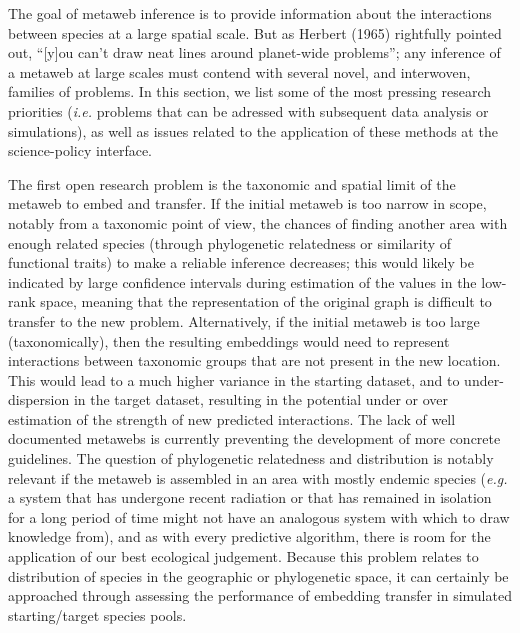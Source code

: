 \documentclass[10pt,oneside]{article}
\begin{document}
The goal of metaweb inference is to provide information about the
interactions between species at a large spatial scale. But as Herbert
(1965) rightfully pointed out, ``{[}y{]}ou can't draw neat lines around
planet-wide problems''; any inference of a metaweb at large scales must
contend with several novel, and interwoven, families of problems. In
this section, we list some of the most pressing research priorities
(\emph{i.e.} problems that can be adressed with subsequent data analysis
or simulations), as well as issues related to the application of these
methods at the science-policy interface.

The first open research problem is the taxonomic and spatial limit of
the metaweb to embed and transfer. If the initial metaweb is too narrow
in scope, notably from a taxonomic point of view, the chances of finding
another area with enough related species (through phylogenetic
relatedness or similarity of functional traits) to make a reliable
inference decreases; this would likely be indicated by large confidence
intervals during estimation of the values in the low-rank space, meaning
that the representation of the original graph is difficult to transfer
to the new problem. Alternatively, if the initial metaweb is too large
(taxonomically), then the resulting embeddings would need to represent
interactions between taxonomic groups that are not present in the new
location. This would lead to a much higher variance in the starting
dataset, and to under-dispersion in the target dataset, resulting in the
potential under or over estimation of the strength of new predicted
interactions. The lack of well documented metawebs is currently
preventing the development of more concrete guidelines. The question of
phylogenetic relatedness and distribution is notably relevant if the
metaweb is assembled in an area with mostly endemic species (\emph{e.g.}
a system that has undergone recent radiation or that has remained in
isolation for a long period of time might not have an analogous system
with which to draw knowledge from), and as with every predictive
algorithm, there is room for the application of our best ecological
judgement. Because this problem relates to distribution of species in
the geographic or phylogenetic space, it can certainly be approached
through assessing the performance of embedding transfer in simulated
starting/target species pools.
\end{document}
